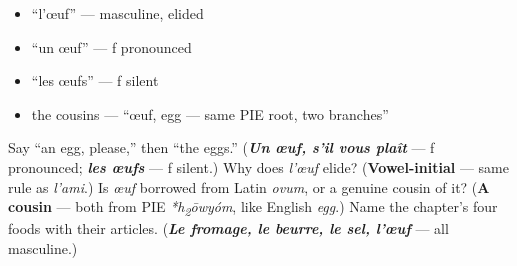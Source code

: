 \begin{itemize}
\raggedright
  \item \textquotedblleft{}l'œuf\textquotedblright{} — masculine, elided
  \item \textquotedblleft{}un œuf\textquotedblright{} — f pronounced
  \item \textquotedblleft{}les œufs\textquotedblright{} — f silent
  \item the cousins — \textquotedblleft{}œuf, egg — same PIE root, two branches\textquotedblright{}
\end{itemize}

\begin{tcolorbox}[breakable,colback=teal!4,colframe=teal!35!black,title={Before you move on}]
Say \textquotedblleft{}an egg, please,\textquotedblright{} then \textquotedblleft{}the eggs.\textquotedblright{} (\emph{\textbf{Un œuf, s'il vous plaît}} — f pronounced; \emph{\textbf{les œufs}} — f silent.) Why does \emph{l'œuf} elide? (\textbf{Vowel-initial} — same rule as \emph{l'ami}.) Is \emph{œuf} borrowed from Latin \emph{ovum}, or a genuine cousin of it? (\textbf{A cousin} — both from PIE \emph{*h\textsubscript{2}ōwyóm}, like English \emph{egg}.) Name the chapter's four foods with their articles. (\emph{\textbf{Le fromage, le beurre, le sel, l'œuf}} — all masculine.)
\end{tcolorbox}
